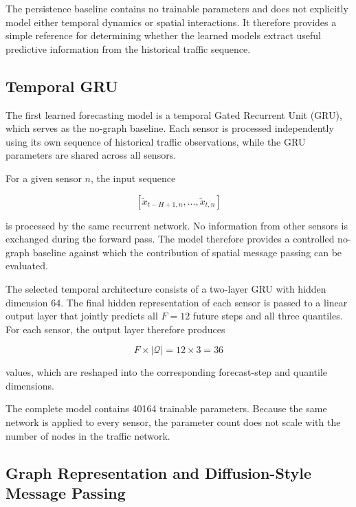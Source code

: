 The persistence baseline contains no trainable parameters and does not
explicitly model either temporal dynamics or spatial interactions. It
therefore provides a simple reference for determining whether the learned
models extract useful predictive information from the historical traffic
sequence.


\subsection{Temporal GRU}
\label{subsec:gru}

The first learned forecasting model is a temporal Gated Recurrent Unit
(GRU), which serves as the no-graph baseline.
Each sensor is
processed independently using its own sequence of historical traffic
observations, while the GRU parameters are shared across all sensors.

For a given sensor $n$, the input sequence

\begin{equation}
    \left[
        \tilde{x}_{t-H+1,n},
        \ldots,
        \tilde{x}_{t,n}
    \right]
\end{equation}

is processed by the same recurrent network. No information from other
sensors is exchanged during the forward pass. The model therefore provides a
controlled no-graph baseline against which the contribution of spatial
message passing can be evaluated.

The selected temporal architecture consists of a two-layer GRU with hidden
dimension 64. The final hidden representation of each sensor is passed to a
linear output layer that jointly predicts all $F=12$ future steps and all
three quantiles. For each sensor, the output layer therefore produces

\begin{equation}
    F \times |\mathcal{Q}| = 12 \times 3 = 36
\end{equation}

values, which are reshaped into the corresponding forecast-step and quantile
dimensions.

The complete model contains 40164 trainable parameters. Because the same
network is applied to every sensor, the parameter count does not scale with
the number of nodes in the traffic network.


\subsection{Graph Representation and Diffusion-Style Message Passing}
\label{subsec:graph}


